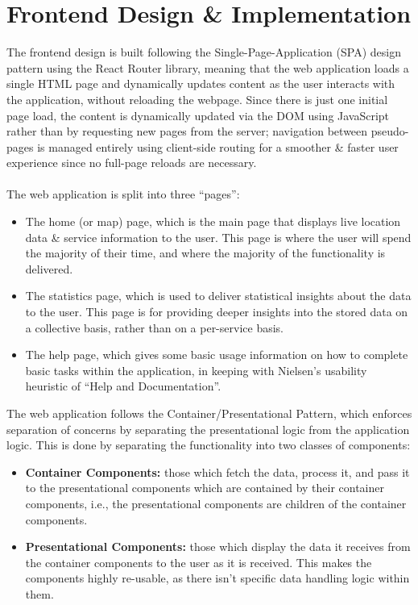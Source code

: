 \documentclass[a4paper,11pt]{report}
\begin{document}
\chapter{Frontend Design \& Implementation}
The frontend design is built following the Single-Page-Application (SPA)\supercite{spa} design pattern using the React Router\supercite{reactrouter} library, meaning that the web application loads a single HTML page and dynamically updates content as the user interacts with the application, without reloading the webpage. 
Since there is just one initial page load, the content is dynamically updated via the DOM using JavaScript rather than by requesting new pages from the server;
navigation between pseudo-pages is managed entirely using client-side routing for a smoother \& faster user experience since no full-page reloads are necessary.
\\\\
The web application is split into three ``pages'':
\begin{itemize}
  \item   The home (or map) page, which is the main page that displays live location data \& service information to the user.
          This page is where the user will spend the majority of their time, and where the majority of the functionality is delivered.
  \item   The statistics page, which is used to deliver statistical insights about the data to the user.
          This page is for providing deeper insights into the stored data on a collective basis, rather than on a per-service basis.

      \item   The help page, which gives some basic usage information on how to complete basic tasks within the application, in keeping with Nielsen's usability heuristic of ``Help and Documentation''\supercite{nielsenheuristics}.
\end{itemize}

The web application follows the Container/Presentational Pattern\supercite{containerpresentational}, which enforces separation of concerns by separating the presentational logic from the application logic.
This is done by separating the functionality into two classes of components:
\begin{itemize}
  \item   \textbf{Container Components:} those which fetch the data, process it, and pass it to the presentational components which are contained by their container components, i.e., the presentational components are children of the container components.
  \item   \textbf{Presentational Components:} those which display the data it receives from the container components to the user as it is received.
          This makes the components highly re-usable, as there isn't specific data handling logic within them.
\end{itemize}
\end{document}
